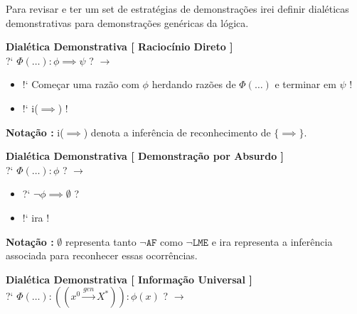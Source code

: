\documentclass[10pt,a4paper]{report}
\begin{document}
Para revisar e ter um set de estratégias de demonstrações irei definir dialéticas demonstrativas para demonstrações genéricas da lógica.

\hspace{\baselineskip}

\textbf{Dialética Demonstrativa [ Raciocínio Direto ]} \\

?` $ \Phi(\dots) : \phi \implies \psi $ ? $\rightarrow$

\begin{itemize}
	\item[ (1) ] !` Começar uma razão com $\phi$ herdando razões de $\Phi(\dots)$ e terminar em $\psi$ !
	\item[ (2) ] !` i($\implies$) !
\end{itemize}

\textbf{Notação :} i($\implies$) denota a inferência de reconhecimento de $\{ \implies \}$.

\hspace{\baselineskip}

\textbf{Dialética Demonstrativa [ Demonstração por Absurdo ]}\\

?` $ \Phi(\dots) : \phi $ ? $\rightarrow$

\begin{itemize}
	\item[ (1) ] ?` $ \neg \phi \implies \emptyset $  ?
	\item[ (2) ] !` ira !
\end{itemize}

\textbf{Notação :} $\emptyset$ representa tanto $\neg \texttt{AF}$ como $\neg \texttt{LME}$ e ira representa a inferência associada para reconhecer essas ocorrências.

\hspace{\baselineskip}

\textbf{Dialética Demonstrativa [ Informação Universal ]} \\

?` $ \Phi(\dots) : (( x^0 \overset{gen}{\rightarrow} X^* )) : \phi(x) $ ? $\rightarrow$
\end{document}
